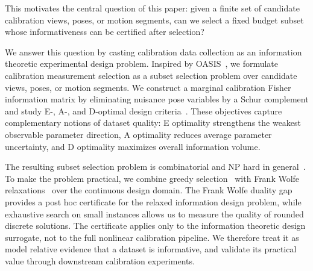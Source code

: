 \documentclass[letterpaper, 9
 pt, conference]{ieeeconf}
\begin{document}
This motivates the central question of this paper: given a finite set of
candidate calibration views, poses, or motion segments, can we select a
fixed budget subset whose informativeness can be certified after selection?

We answer this question by casting calibration data collection as an
information theoretic experimental design problem. Inspired by OASIS~\citep{kaveti2023oasis}, we
formulate calibration measurement selection as a subset selection problem over
candidate views, poses, or motion segments. We construct a marginal calibration
Fisher information matrix by eliminating nuisance pose variables by a Schur complement and study
E-, A-, and D-optimal design criteria~\citep{oed_book}. These objectives capture complementary
notions of dataset quality: E optimality strengthens the weakest observable
parameter direction, A optimality reduces average parameter uncertainty, and
D optimality maximizes overall information volume.

The resulting subset selection problem is combinatorial and NP hard in general~\citep{civril2009selecting}.
To make the problem practical, we combine greedy selection~\citep{krause2008near} with Frank Wolfe
relaxations~\citep{frank1956algorithm,jaggi2013revisiting} over the continuous design domain. The Frank Wolfe duality gap
provides a post hoc certificate for the relaxed information design problem,
while exhaustive search on small instances allows us to measure the quality of
rounded discrete solutions. The certificate applies only to the
information theoretic design surrogate, not to the full nonlinear calibration
pipeline. We therefore treat it as model relative evidence that a dataset is
informative, and validate its practical value through downstream calibration
experiments.
\end{document}
